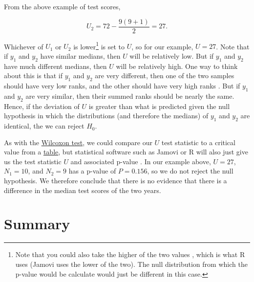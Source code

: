 \documentclass[
]{scrbook}
\begin{document}
From the above example of test scores,

\[U_{2} = 72 - \frac{9\left(9 + 1 \right)}{2} = 27.\]

Whichever of \(U_{1}\) or \(U_{2}\) is lower\footnote{Note that you could also take the higher of the two values \citep{Sokal1995}, which is what R uses (Jamovi uses the lower of the two). The null distribution from which the p-value would be calculate would just be different in this case.} is set to \(U\), so for our example, \(U = 27\).
Note that if \(y_{1}\) and \(y_{2}\) have similar medians, then \(U\) will be relatively low.
But if \(y_{1}\) and \(y_{2}\) have much different medians, then \(U\) will be relatively high.
One way to think about this is that if \(y_{1}\) and \(y_{2}\) are very different, then one of the two samples should have very low ranks, and the other should have very high ranks \citep{Sokal1995}.
But if \(y_{1}\) and \(y_{2}\) are very similar, then their summed ranks should be nearly the same.
Hence, if the deviation of \(U\) is greater than what is predicted given the null hypothesis in which the distributions (and therefore the medians) of \(y_{1}\) and \(y_{2}\) are identical, the we can reject \(H_{0}\).

As with the \protect\hyperlink{wilcoxon-test}{Wilcoxon test}, we could compare our \(U\) test statistic to a critical value from a \protect\hyperlink{mann-whitney-u-critical-values}{table}, but statistical software such as Jamovi or R will also just give us the test statistic \(U\) and associated p-value \citep{Jamovi2022, Rproject}.
In our example above, \(U = 27\), \(N_{1} = 10\), and \(N_{2} = 9\) has a p-value of \(P = 0.156\), so we do not reject the null hypothesis.
We therefore conclude that there is no evidence that there is a difference in the median test scores of the two years.

\hypertarget{summary-3}{%
\section{Summary}\label{summary-3}}
\end{document}

